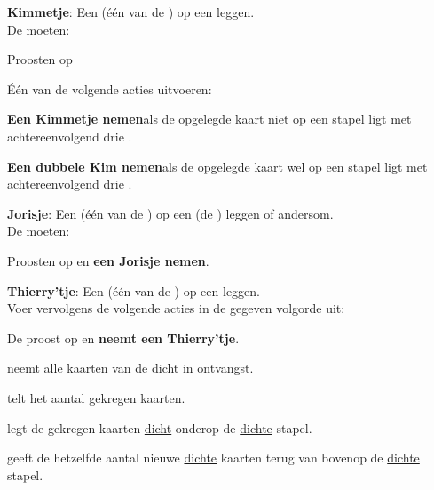 \vervolgLijstKlein{}
\item \label{zet:kim} \textbf{Kimmetje}: Een  (\'e\'en van de ) op een  leggen. \\De \andereSpelers moeten:
\puntLijst{}
\item Proosten op 
\item Één van de volgende acties uitvoeren:
\numeriekeLijst{}
\item \textbf{Een Kimmetje nemen}\footnotemark[1] als de opgelegde kaart \ul{niet} op een stapel ligt met \\achtereenvolgend drie .
\item \textbf{Een dubbele Kim nemen}\footnotemark[2] als de opgelegde kaart \ul{wel} op een stapel ligt met \\achtereenvolgend drie .
\eindNumeriekeLijst{}
\eindPuntLijst{}
\eindLijst{}


\newpage
{}
\label{sec:zettenLang_2}

\vervolgLijstKlein{}
\item \label{zet:joris} \textbf{Jorisje}: Een  (\'e\'en van de ) op een  (de ) leggen of andersom. \\De \andereSpelers moeten:
\puntLijst{}
\item Proosten op  en \textbf{een Jorisje nemen}\footnotemark[1].
\eindPuntLijst{}
\eindLijst{}


\vervolgLijstKlein{}
\item \textbf{Thierry'tje}: Een  (\'e\'en van de ) op een  leggen. \\Voer vervolgens de volgende acties in de gegeven volgorde uit:
\puntLijst{}
\item De \huidigeSpeler proost op  en \textbf{neemt een Thierry'tje}\footnotemark[2].
\item \Frits neemt alle kaarten van de \huidigeSpeler \ul{dicht} in ontvangst.
\item \Frits telt het aantal gekregen kaarten.
\item \Frits legt de gekregen kaarten \ul{dicht} onderop de \ul{dichte} stapel.
\item \Frits geeft de \huidigeSpeler hetzelfde aantal nieuwe \ul{dichte} kaarten terug van bovenop de \ul{dichte} stapel.
\eindPuntLijst{}
\label{zet:thierry}
\eindLijst{}


